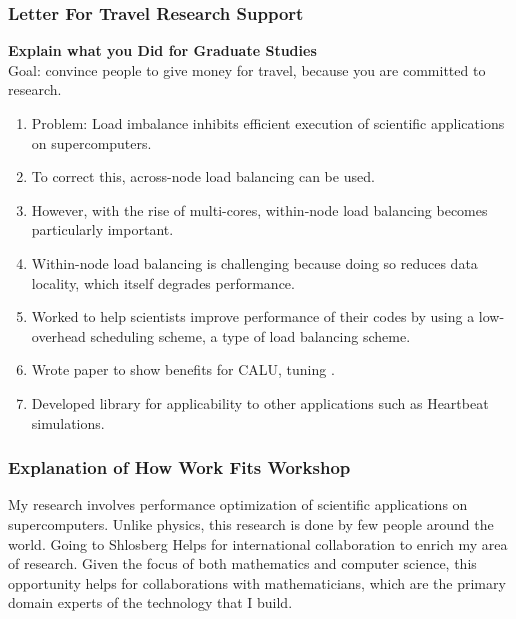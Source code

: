 \begin{frame}
\frametitle{Letter For Travel Research Support} 
\textbf{\small Explain what you Did for Graduate Studies}\\
{\tiny Goal: convince people to give money for travel, because you are
committed to research. }
\begin{enumerate}
  \tiny \item \tiny Problem: Load imbalance inhibits efficient
  execution of scientific applications on supercomputers. 
\item \tiny To correct this, across-node load balancing can be used.  
\item \tiny However, with the rise of multi-cores, within-node load balancing becomes
  particularly important. 
\item \tiny Within-node load balancing is challenging because doing so
  reduces data locality, which itself degrades performance.  
\item \tiny Worked to help scientists improve performance of their
  codes by using a low-overhead scheduling scheme, a type of load 
  balancing scheme. 
\item \tiny Wrote paper to show benefits for CALU, tuning . 
\item \tiny Developed library for applicability to other
  applications such as Heartbeat simulations. 
\end{enumerate} 
\end{frame} 

\begin{frame}
\frametitle{Explanation of How Work Fits Workshop} 
\begin{outline}[enumerate] 
\tiny \1 {\tiny My research involves performance optimization of
  scientific applications on supercomputers. Unlike physics, 
  this research is done by few people around the world.}
\tiny \1 {\tiny Going to Shlosberg Helps for international
  collaboration to enrich my area of research.} 
\tiny \1 {\tiny Given the focus of both mathematics and computer
  science, this opportunity helps for collaborations with
  mathematicians, which are the primary domain experts of the
  technology that I build.}
\end{outline}
\end{frame} 


